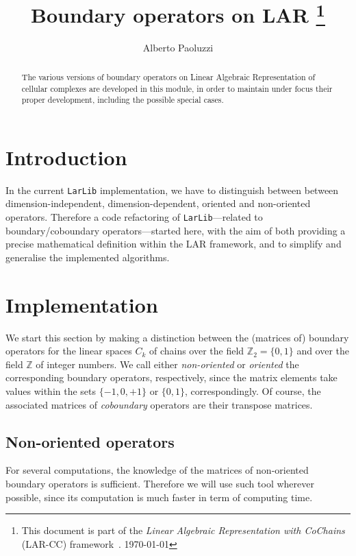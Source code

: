 \documentclass[11pt,oneside]{article}	%
\title{Boundary operators on LAR
\footnote{This document is part of the \emph{Linear Algebraic Representation with CoChains} (LAR-CC) framework~\cite{cclar-proj:2013:00}. \today}
}
\author{Alberto Paoluzzi}
\def\Z{\mathbb{Z}}
\begin{document}
\maketitle
\nonstopmode

\begin{abstract}
The various versions of boundary operators on Linear Algebraic Representation of cellular complexes are  developed in this module, in order to maintain under focus their proper development, including the possible special cases.
\end{abstract}

\tableofcontents
\newpage

\section{Introduction}

In the current \texttt{LarLib} implementation, we have to distinguish between between dimension-independent, dimension-dependent, oriented and non-oriented operators.
Therefore a code refactoring of \texttt{LarLib}---related to boundary/coboundary operators---started here, with the aim of both providing a precise mathematical definition within the LAR framework, and to simplify and generalise the implemented algorithms.


\section{Implementation}

We start this section by making a distinction between the (matrices of) boundary operators for the linear spaces $C_k$ of chains over the field $\Z_2 = \{0,1\}$ and over the field $\Z$ of integer numbers.
We call either \emph{non-oriented} or \emph{oriented} the corresponding boundary operators, respectively, since the matrix elements take values within the sets $\{-1,0,+1\}$ or $\{0,1\}$, correspondingly.
Of course, the associated matrices of \emph{coboundary} operators are their transpose matrices.


\subsection{Non-oriented operators}

For several computations, the knowledge of the matrices of non-oriented boundary operators is sufficient. 
Therefore we will use such tool wherever possible, since its computation is much faster in term of computing time. 
\end{document}
